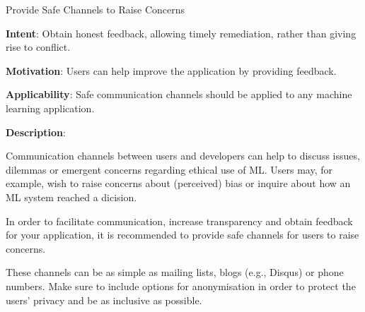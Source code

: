   
  \begin{frame}[plain]{ Provide Safe Channels to Raise Concerns
 }

  \textbf{Intent}: Obtain honest feedback, allowing timely remediation, rather than giving rise to conflict.  
 

  \textbf{Motivation}: Users can help improve the application by providing feedback.  
 

  \textbf{Applicability}: Safe communication channels should be applied to any machine learning application.
 

  \textbf{Description}: 

Communication channels between users and developers can help to discuss issues, dilemmas or emergent concerns regarding ethical use of ML. Users may, for example, wish to raise concerns about (perceived) bias or inquire about how an ML system reached a dicision.


In order to facilitate communication, increase transparency and obtain feedback for your application, it is recommended to provide safe channels for users to raise concerns.


These channels can be as simple as mailing lists, blogs (e.g., Disqus) or phone numbers.
Make sure to include options for anonymisation in order to protect the users' privacy and be as inclusive as possible.


 


  \end{frame}

